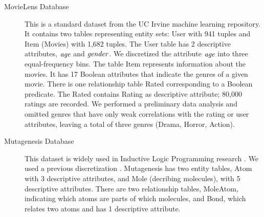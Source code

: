 \documentclass[runningheads,a4paper]{llncs}
\begin{document}
\begin{description}

\item[MovieLens Database] This is a standard dataset from the UC Irvine machine learning repository. 
It contains two tables representing entity sets: User with 941 tuples and Item (Movies) with 1,682 tuples.
The User table has 2 descriptive attributes, $\mathit{age}$ and $\it{gender}$. We discretized the attribute $\mathit{age}$ into three equal-frequency bins. The table Item represents information about the movies. It has 17 Boolean attributes that indicate the genres of a given movie. There is one relationship table Rated corresponding to a Boolean predicate. The Rated contains Rating as descriptive attribute; 80,000 ratings are recorded.  We performed a preliminary data analysis and omitted genres that have only weak correlations with the rating or user attributes, leaving a total of three genres (Drama, Horror, Action).
%

\item[Mutagenesis Database] This dataset is widely used in Inductive Logic Programming research \cite{Srinivasan1996}. %
We used a previous discretization \cite{Schulte2012}.
Mutagenesis has two entity tables, Atom with 3 descriptive attributes, and Mole (decribing molecules), with 5 descriptive attributes. 
There are two relationship tables, MoleAtom, indicating which atoms are parts of which molecules, and Bond, which relates two atoms and has 1 descriptive attribute. 


\end{description}
\end{document}
